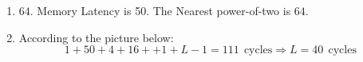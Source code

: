 \documentclass[12pt]{article}
\begin{document}
\begin{enumerate}[label=\alph*.]
	
	\item 
	
	$64$. Memory Latency is 50. The Nearest power-of-two is $64$.
	
	
	\item 
		
		According to the picture below: 
	$$1 + 50 + 4 + 16 + + 1+ L-1 = 111 ~~\text{cycles} \Rightarrow L = 40 ~~\text{cycles}$$
	
	
	
	\begin{tikzpicture}[x=0.75pt,y=0.75pt,yscale=-1,xscale=1]
		

\end{tikzpicture}
\end{enumerate}
\end{document}
